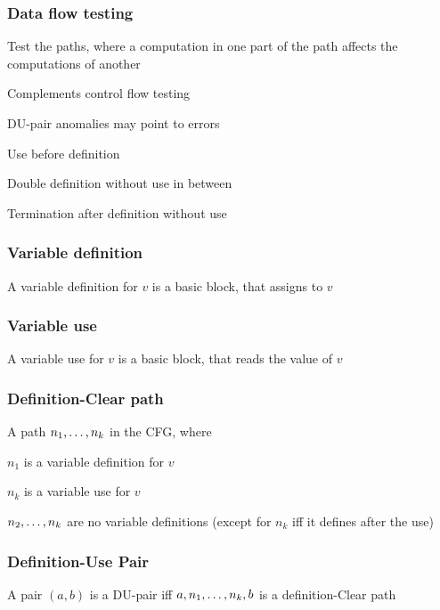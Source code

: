 \subsubsection{Data flow testing}
\enumstart
	\item Test the paths, where a computation in one part of the path affects the computations of another
	\item Complements control flow testing
	\item DU-pair anomalies may point to errors
	\enumstart
		\item Use before definition
		\item Double definition without use in between
		\item Termination after definition without use
	\enumend
\enumend

\subsubsection{Variable definition}
\enumstart
	\item A variable definition for $v$ is a basic block, that assigns to $v$
\enumend

\subsubsection{Variable use}
\enumstart
	\item A variable use for $v$ is a basic block, that reads the value of $v$
\enumend

\subsubsection{Definition-Clear path}
\enumstart
	\item A path $n_1, \mathellipsis, n_k$ in the CFG, where
	\enumstart
		\item $n_1$ is a variable definition for $v$
		\item $n_k$ is a variable use for $v$
		\item $n_2, \mathellipsis, n_{k}$ are no variable definitions (except for $n_k$ iff it defines after the use)
	\enumend
	\item 
\enumend

\subsubsection{Definition-Use Pair}
\enumstart
	\item A pair $(a,b)$ is a DU-pair iff $a, n_1, \mathellipsis, n_k, b$ is a definition-Clear path
\enumend

